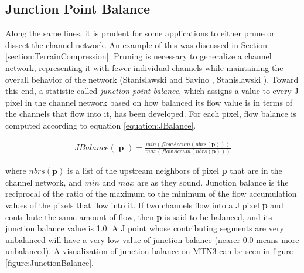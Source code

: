 \subsection{Junction Point Balance}
\label{section:JunctionBalance}


Along the same lines, it is prudent for some applications to either prune or dissect the channel network. An example of this was discussed in Section \ref{section:TerrainCompression}. Pruning is necessary to generalize a channel network, representing it with fewer individual channels while maintaining the overall behavior of the network (Stanislawski and Savino \cite{stanislawski-pruning}, Stanislawski \cite{citeulike:5493394}). Toward this end, a statistic called \emph{junction point balance}, which assigns a value to every J pixel in the channel network based on how balanced its flow value is in terms of the channels that flow into it, has been developed. For each pixel, flow balance is computed according to equation \ref{equation:JBalance}.

\begin{align}
\label{equation:JBalance}
  JBalance( \textbf{ p } ) = \displaystyle\frac{min( flowAccum( nbrs( \textbf{p} ) ) ) }{ max( flowAccum( nbrs( \textbf{p} ) ) ) }
\end{align}

\noindent where $nbrs(\textbf{p})$ is a list of the upstream neighbors of pixel \textbf{p} that are in the channel network, and $min$ and $max$ are as they sound. Junction balance is the reciprocal of the ratio of the maximum to the minimum of the flow accumulation values of the pixels that flow into it. If two channels flow into a J pixel \textbf{p} and contribute the same amount of flow, then \textbf{p} is said to be balanced, and its junction balance value is 1.0. A J point whose contributing segments are very unbalanced will have a very low value of junction balance (nearer 0.0 means more unbalanced). 
A visualization of junction balance on MTN3 can be seen in figure \ref{figure:JunctionBalance}.

